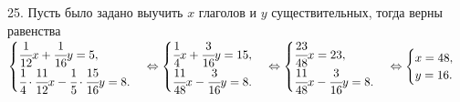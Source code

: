 25. Пусть было задано выучить $x$ глаголов и $y$ существительных, тогда верны равенства\\
$\begin{cases}\cfrac{1}{12}x+\cfrac{1}{16}y=5,\\ \cfrac{1}{4}\cdot\cfrac{11}{12}x-\cfrac{1}{5}\cdot\cfrac{15}{16}y=8.\end{cases}\Leftrightarrow
\begin{cases}\cfrac{1}{4}x+\cfrac{3}{16}y=15,\\ \cfrac{11}{48}x-\cfrac{3}{16}y=8.\end{cases}\Leftrightarrow
\begin{cases}\cfrac{23}{48}x=23,\\ \cfrac{11}{48}x-\cfrac{3}{16}y=8.\end{cases}\Leftrightarrow
\begin{cases} x=48,\\ y=16.\end{cases}$\\
